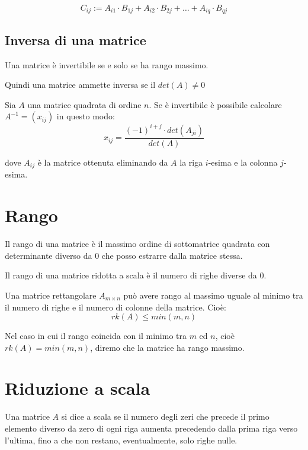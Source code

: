 $$C_{ij} := A_{i1} \cdot B_{1j} + A_{i2} \cdot B_{2j} + \ldots + A_{iq} \cdot B_{qj}$$

\subsection{Inversa di una matrice}

\begin{theorem}
Una matrice è invertibile se e solo se ha rango massimo.
\end{theorem}

Quindi una matrice ammette inversa se il $det(A) \neq 0$

\begin{theorem}
Sia $A$ una matrice quadrata di ordine $n$. Se è invertibile è possibile calcolare $A^{-1}=(x_{ij})$ in questo modo:
$$ x_{ij} = \frac{(-1)^{i+j}\cdot det(A_{ji})}{det(A)}$$

dove $A_{ij}$ è la matrice ottenuta eliminando da $A$ la riga $i$-esima e la colonna $j$-esima.
\end{theorem}

\section{Rango}

\begin{definition}
Il rango di una matrice è il massimo ordine di sottomatrice quadrata con determinante diverso da 0 che posso estrarre dalla matrice stessa.
\end{definition}

\begin{definition}
Il rango di una matrice ridotta a scala è il numero di righe diverse da 0.
\end{definition}

Una matrice rettangolare $A_{m \times n}$ può avere rango al massimo uguale al minimo tra il numero di righe e il numero di colonne della matrice. Cioè:
$$rk(A)\leq min(m,n)$$

Nel caso in cui il rango coincida con il minimo tra $m$ ed $n$, cioè $rk(A)= min(m,n)$, diremo che la matrice ha rango massimo.

\section{Riduzione a scala}

\begin{definition}
Una matrice $A$ si dice a scala se il numero degli zeri che precede il primo elemento diverso da zero di ogni riga aumenta precedendo dalla prima riga verso l'ultima, fino a che non restano, eventualmente, solo righe nulle.
\end{definition}

